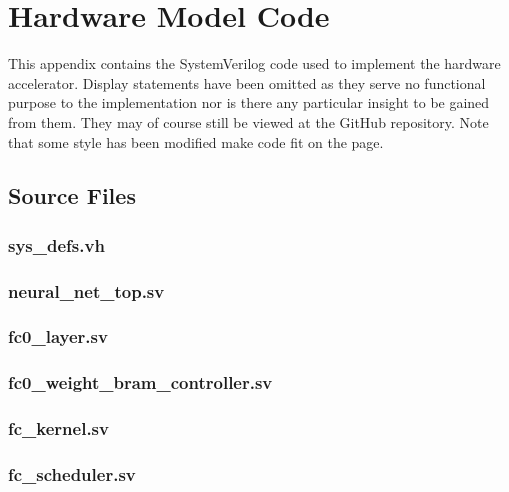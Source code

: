 \chapter{Hardware Model Code}\label{app:hw}
This appendix contains the SystemVerilog code used to implement the hardware accelerator. Display statements have been omitted as they serve no functional purpose to the implementation nor is there any particular insight to be gained from them. They may of course still be viewed at the GitHub repository. Note that some style has been modified make code fit on the page.


\lstset{basicstyle=\footnotesize\ttfamily, captionpos=t}
\section{Source Files}
\subsection{sys\_defs.vh}

\pagebreak

\subsection{neural\_net\_top.sv}

\pagebreak

\subsection{fc0\_layer.sv}

\pagebreak

\subsection{fc0\_weight\_bram\_controller.sv}

\pagebreak

\subsection{fc\_kernel.sv}

\pagebreak

\subsection{fc\_scheduler.sv}

\pagebreak

